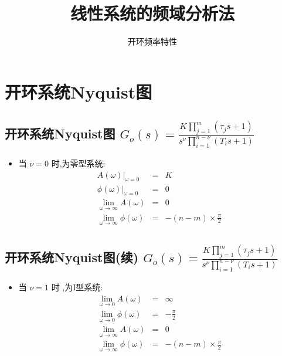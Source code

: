 \documentclass[table]{beamer}
\subtitle{开环频率特性}
\date{}
\title{线性系统的频域分析法}
\begin{document}
\maketitle
\tableofcontents











\section{开环系统Nyquist图}
\label{sec:org0a41274}
\subsection{开环系统Nyquist图 \(G_o(s) =\frac{K\prod_{j=1}^m(\tau_j s+1)}{s^{\nu}\prod_{i=1}^{n-\nu}(T_i s+1)}\)}
\label{sec:orgf185312}
\begin{itemize}
\item 当  \(\nu=0\)  时,为零型系统:
\begin{eqnarray*}
\left. A(\omega)\right|_{\omega=0} & = & K\\
\left. \phi(\omega)\right|_{\omega=0}&=&0 \\
\lim_{\omega\rightarrow\infty} A(\omega)&=&0 \\
\lim_{\omega\rightarrow\infty} \phi(\omega)&=& -(n-m)\times\frac{\pi}{2} 
\end{eqnarray*}
\end{itemize}
\subsection{开环系统Nyquist图(续) \(G_o(s) =\frac{K\prod_{j=1}^m(\tau_j s+1)}{s^{\nu}\prod_{i=1}^{n-\nu}(T_i s+1)}\)}
\label{sec:org7f0a155}
\begin{itemize}
\item 当  \(\nu=1\)  时 ,为I型系统:
\begin{eqnarray*}
\lim_{\omega\rightarrow 0} A(\omega) & = & \infty\\
\lim_{\omega\rightarrow 0} \phi(\omega)&=&-\frac{\pi}{2} \\
\lim_{\omega\rightarrow\infty} A(\omega)&=&0 \\
\lim_{\omega\rightarrow\infty} \phi(\omega)&=& -(n-m)\times\frac{\pi}{2} 
\end{eqnarray*}
\end{itemize}
\end{document}
